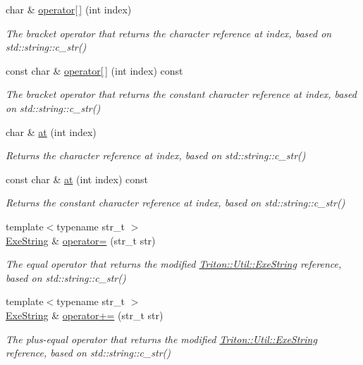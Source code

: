\begin{DoxyCompactItemize}
char \& \hyperlink{class_triton_1_1_util_1_1_exe_string_a4268c0f089139eb0dd328ccf95bfaef0}{operator\mbox{[}$\,$\mbox{]}} (int index)
\begin{DoxyCompactList}\small\item\em The bracket operator that returns the character reference at index, based on std\+::string\+::c\+\_\+str() \end{DoxyCompactList}\item 
const char \& \hyperlink{class_triton_1_1_util_1_1_exe_string_aa3aca8d6b0adb98c73041f79b124072b}{operator\mbox{[}$\,$\mbox{]}} (int index) const 
\begin{DoxyCompactList}\small\item\em The bracket operator that returns the constant character reference at index, based on std\+::string\+::c\+\_\+str() \end{DoxyCompactList}\item 
char \& \hyperlink{class_triton_1_1_util_1_1_exe_string_ac0cab9d04e014ba6367467e0fadf1727}{at} (int index)
\begin{DoxyCompactList}\small\item\em Returns the character reference at index, based on std\+::string\+::c\+\_\+str() \end{DoxyCompactList}\item 
const char \& \hyperlink{class_triton_1_1_util_1_1_exe_string_acb2c38034d6d1938418bfebf7c59eb01}{at} (int index) const 
\begin{DoxyCompactList}\small\item\em Returns the constant character reference at index, based on std\+::string\+::c\+\_\+str() \end{DoxyCompactList}\item 
{\footnotesize template$<$typename str\+\_\+t $>$ }\\\hyperlink{class_triton_1_1_util_1_1_exe_string}{Exe\+String} \& \hyperlink{class_triton_1_1_util_1_1_exe_string_a6dad27a5608a29f386d684dbd00882bd}{operator=} (str\+\_\+t str)
\begin{DoxyCompactList}\small\item\em The equal operator that returns the modified \hyperlink{class_triton_1_1_util_1_1_exe_string}{Triton\+::\+Util\+::\+Exe\+String} reference, based on std\+::string\+::c\+\_\+str() \end{DoxyCompactList}\item 
{\footnotesize template$<$typename str\+\_\+t $>$ }\\\hyperlink{class_triton_1_1_util_1_1_exe_string}{Exe\+String} \& \hyperlink{class_triton_1_1_util_1_1_exe_string_a48acb0a114a0ad132c3e8cd3a2f7af68}{operator+=} (str\+\_\+t str)
\begin{DoxyCompactList}\small\item\em The plus-\/equal operator that returns the modified \hyperlink{class_triton_1_1_util_1_1_exe_string}{Triton\+::\+Util\+::\+Exe\+String} reference, based on std\+::string\+::c\+\_\+str() \end{DoxyCompactList}\end{DoxyCompactItemize}
